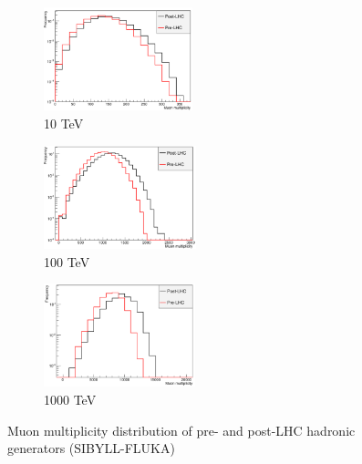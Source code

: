 \documentclass[12pt]{article}
\begin{document}
\begin{figure}
\begin{subfigure}{0.32\textwidth}
\includegraphics[width=0.9\linewidth, height=3cm]{sibyll-lhc-mm10} 
\caption{10 TeV}
\label{fig:sibyll-lhc-mm10}
\end{subfigure}
\begin{subfigure}{0.32\textwidth}
\includegraphics[width=0.9\linewidth, height=3cm]{sibyll-lhc-mm100} 
\caption{100 TeV}
\label{fig:sibyll-lhc-mm100}
\end{subfigure}
\begin{subfigure}{0.32\textwidth}
\includegraphics[width=0.9\linewidth, height = 3cm]{sibyll-lhc-mm1000} 
\caption{1000 TeV}
\label{fig:sibyll-lhc-mm1000}
\end{subfigure}
\caption{Muon multiplicity distribution of pre- and post-LHC hadronic generators (SIBYLL-FLUKA)}
\label{fig:lhc_multiplicity_sibyll}
\end{figure}
\end{document}

